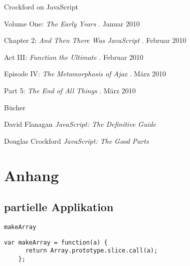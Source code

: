 \begin{frame}{Crockford on JavaScript}
  \begin{thebibliography}{1}
     Volume One:
    \emph{The Early Years}
    . Januar 2010
    
     Chapter 2:
    \emph{And Then There Was JavaScript}
    . Februar 2010
    
     Act III:
    \emph{Function the Ultimate}
    . Februar 2010
    
     Episode IV:
    \emph{The Metamorphosis of Ajax}
    . März 2010
    
     Part 5:
    \emph{The End of All Things}
    . März 2010
    
  \end{thebibliography}
\end{frame}

\begin{frame}{Bücher}
  \begin{thebibliography}{1}
     David Flanagan
    \newblock \emph{JavaScript: The Definitive Guide}
    
     Douglas Crockford
    \newblock \emph{JavaScript: The Good Parts}
  \end{thebibliography}
\end{frame}

\appendix

\section{Anhang}

\subsection{partielle Applikation}

\begin{frame}[fragile]{\texttt{makeArray}}
  \begin{lstlisting}[gobble=4]
    var makeArray = function(a) {
      return Array.prototype.slice.call(a);
    };
  \end{lstlisting}  
\end{frame}

